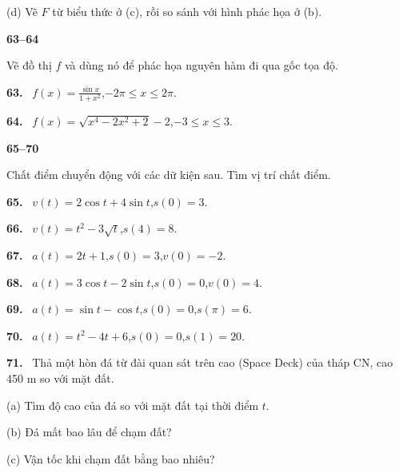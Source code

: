 \documentclass[12pt,a4paper]{article}
\newcommand{\bt}[1]{\par\smallskip\Needspace{5\baselineskip}\noindent\textbf{#1.}\ }
\newcommand{\group}[1]{\par\medskip\noindent\textbf{#1}\par\nopagebreak[4]}
\begin{document}
(d) Vẽ $F$ từ biểu thức ở (c), rồi so sánh với hình phác họa ở (b).
\group{63–64}
Vẽ đồ thị $f$ và dùng nó để phác họa nguyên hàm đi qua gốc tọa độ.
\bt{63} $\displaystyle f(x)=\frac{\sin x}{1+x^2}$,\quad $-2\pi\le x\le2\pi$.
\bt{64} $f(x)=\sqrt{x^4-2x^2+2}-2$,\quad $-3\le x\le3$.
\group{65–70}
Chất điểm chuyển động với các dữ kiện sau. Tìm vị trí chất điểm.
\bt{65} $v(t)=2\cos t+4\sin t$,\quad $s(0)=3$.
\bt{66} $v(t)=t^2-3\sqrt t$,\quad $s(4)=8$.
\bt{67} $a(t)=2t+1$,\quad $s(0)=3$,\quad $v(0)=-2$.
\bt{68} $a(t)=3\cos t-2\sin t$,\quad $s(0)=0$,\quad $v(0)=4$.
\bt{69} $a(t)=\sin t-\cos t$,\quad $s(0)=0$,\quad $s(\pi)=6$.
\bt{70} $a(t)=t^2-4t+6$,\quad $s(0)=0$,\quad $s(1)=20$.
\bt{71} Thả một hòn đá từ đài quan sát trên cao (Space Deck) của tháp CN, cao 450 m so với mặt đất.

(a) Tìm độ cao của đá so với mặt đất tại thời điểm $t$.

(b) Đá mất bao lâu để chạm đất?

(c) Vận tốc khi chạm đất bằng bao nhiêu?
\end{document}
